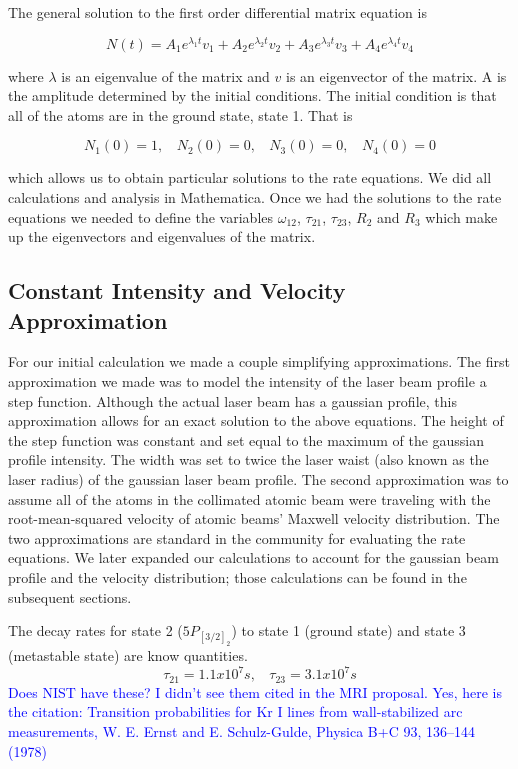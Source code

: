 \documentclass[prb,preprint]{revtex4-1}
\begin{document}
The general solution to the first order differential matrix equation is

\begin{equation}
\label{RateEqSol}
N(t) = A_1e^{\lambda_1 t} v_1 + A_2e^{\lambda_2 t} v_2 + A_3e^{\lambda_3 t} v_3 + A_4e^{\lambda_4 t} v_4 
\end{equation}

where $\lambda$ is an eigenvalue of the matrix and $v$ is an eigenvector of the matrix.  A is the amplitude determined by the initial conditions. The initial condition is that all of the atoms are in the ground state, state 1. That is

\begin{equation}
\label{InitialCond}
N_1(0) = 1, \	\	\	\	
N_2(0) = 0, \	\	\	\	
N_3(0) = 0, \	\	\	\	
N_4(0) = 0 
\end{equation}

which allows us to obtain particular solutions to the rate equations. We did all calculations and analysis in Mathematica. Once we had the solutions to the rate equations we needed to define the variables $\omega_{12}$, $\tau_{21}$, $\tau_{23}$, $R_2$ and $R_3$ which make up the eigenvectors and eigenvalues of the matrix.

\subsection{Constant Intensity and Velocity Approximation} 

For our initial calculation we made a couple simplifying approximations. The first approximation we made was to model the intensity of the laser beam profile a step function.  Although the actual laser beam has a gaussian profile, this approximation allows for an exact solution to the above equations.  The height of the step function was constant and set equal to the maximum of the gaussian profile intensity. The width was set to twice the laser waist (also known as the laser radius) of the gaussian laser beam profile.  The second approximation was to assume all of the atoms in the collimated atomic beam were traveling with the root-mean-squared velocity of atomic beams' Maxwell velocity distribution.  The two approximations are standard in the community for evaluating the rate equations.  We later expanded our calculations to account for the gaussian beam profile and the velocity distribution; those calculations can be found in the subsequent sections. 

The decay rates for state 2 ($5P_{[3/2]_2}$) to state 1 (ground state) and state 3 (metastable state) are know quantities.
\begin{equation}
\label{DecayRates} 
\tau_{21} = 1.1x10^7 s, \	\	\	\	 \tau_{23} = 3.1x10^7s
\end{equation} 
\textcolor{blue}{Does NIST have these? I didn't see them cited in the MRI proposal. Yes, here is the citation: Transition probabilities for Kr I lines from wall-stabilized arc measurements, W. E. Ernst and E. Schulz-Gulde, Physica B+C 93, 136–144 (1978)}
\end{document}
